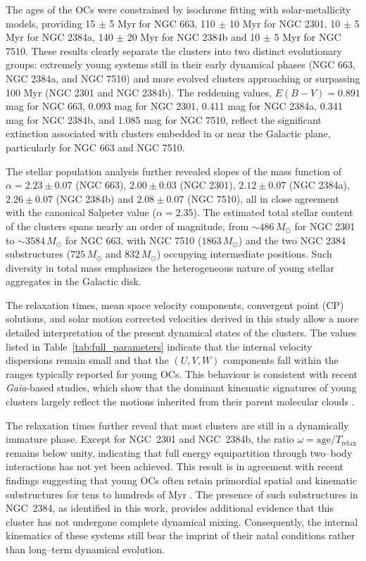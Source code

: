 \documentclass[referee]{raa}            %
\begin{document}
The ages of the OCs were constrained by isochrone fitting with solar-metallicity models, providing 15 $\pm$ 5 Myr for NGC 663, 110 $\pm$ 10 Myr for NGC 2301, 10 $\pm$ 5 Myr for NGC 2384a, 140 $\pm$ 20 Myr for NGC 2384b and 10 $\pm$ 5 Myr for NGC 7510. These results clearly separate the clusters into two distinct evolutionary groups: extremely young systems still in their early dynamical phases (NGC 663, NGC 2384a, and NGC 7510) and more evolved clusters approaching or surpassing 100 Myr (NGC 2301 and NGC 2384b). The reddening values, $E(B-V) = 0.891$ mag for NGC 663, 0.093 mag for NGC 2301, 0.411 mag for NGC 2384a, 0.341 mag for NGC 2384b, and 1.085 mag for NGC 7510, reflect the significant extinction associated with clusters embedded in or near the Galactic plane, particularly for NGC 663 and NGC 7510.  

The stellar population analysis further revealed slopes of the mass function of $\alpha = 2.23 \pm 0.07$ (NGC 663), $2.00 \pm 0.03$ (NGC 2301), $2.12 \pm 0.07$ (NGC 2384a), $2.26 \pm 0.07$ (NGC 2384b) and $2.08 \pm 0.07$ (NGC 7510), all in close agreement with the canonical Salpeter value ($\alpha = 2.35$). The estimated total stellar content of the clusters spans nearly an order of magnitude, from $\sim 486\,M_\odot$ for NGC 2301 to $\sim 3584\,M_\odot$ for NGC 663, with NGC 7510 ($1863\,M_\odot$) and the two NGC 2384 substructures ($725\,M_\odot$ and $832\,M_\odot$) occupying intermediate positions. Such diversity in total mass emphasizes the heterogeneous nature of young stellar aggregates in the Galactic disk.  

The relaxation times, mean space velocity components, convergent point (CP) solutions, and solar motion corrected velocities derived in this study allow a more detailed interpretation of the present dynamical states of the clusters. The values listed in Table~\ref{tab:full_parameters} indicate that the internal velocity dispersions remain small and that the $(U, V, W)$ components fall within the ranges typically reported for young OCs. This behaviour is consistent with recent \textit{Gaia}-based studies, which show that the dominant kinematic signatures of young clusters largely reflect the motions inherited from their parent molecular clouds \citep{Soubiran_2018, Cantat_2020}.

The relaxation times further reveal that most clusters are still in a dynamically immature phase. Except for NGC~2301 and NGC~2384b, the ratio $\omega = \mathrm{age}/T_{\mathrm{relax}}$ remains below unity, indicating that full energy equipartition through two–body interactions has not yet been achieved. This result is in agreement with recent findings suggesting that young OCs often retain primordial spatial and kinematic substructures for tens to hundreds of Myr \citep{Kuhn2019, Pang2021}. The presence of such substructures in NGC~2384, as identified in this work, provides additional evidence that this cluster has not undergone complete dynamical mixing. Consequently, the internal kinematics of these systems still bear the imprint of their natal conditions rather than long–term dynamical evolution.
\end{document}
